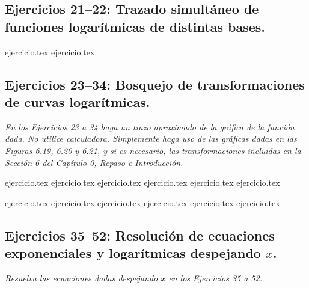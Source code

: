 \subsection*{Ejercicios 21--22: Trazado simultáneo de funciones logarítmicas de distintas bases.}

\begin{enumerate}
    \setcounter{enumi}{20}
    {ejercicio.tex}
    {ejercicio.tex}
\end{enumerate}

\subsection*{Ejercicios 23--34: Bosquejo de transformaciones de curvas logarítmicas.}

\noindent \textit{En los Ejercicios 23 a 34 haga un trazo aproximado de la gráfica de la función dada. No utilice calculadora. Simplemente haga uso de las gráficas dadas en las Figuras 6.19, 6.20 y 6.21, y si es necesario, las transformaciones incluidas en la Sección 6 del Capítulo 0, Repaso e Introducción.}

\begin{enumerate}
    \setcounter{enumi}{22}
    \begin{minipage}{0.45\textwidth}
    {ejercicio.tex}
    {ejercicio.tex}
    {ejercicio.tex}
    {ejercicio.tex}
    {ejercicio.tex}
    {ejercicio.tex}
    \end{minipage}%
    \begin{minipage}{0.45\textwidth}
    {ejercicio.tex}
    {ejercicio.tex}
    {ejercicio.tex}
    {ejercicio.tex}
    {ejercicio.tex}
    {ejercicio.tex}
    \end{minipage}
\end{enumerate}

\subsection*{Ejercicios 35--52: Resolución de ecuaciones exponenciales y logarítmicas despejando $x$.}

\noindent \textit{Resuelva las ecuaciones dadas despejando $x$ en los Ejercicios 35 a 52.}

